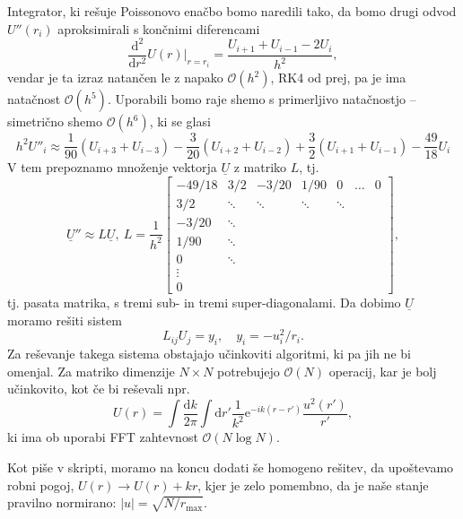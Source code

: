 \documentclass[12pt, a4 paper]{article}
\renewcommand{\d}{
	\ensuremath{\mathrm{d}}
}
\newcommand{\e}{
	\ensuremath{\mathrm{e}}
}
\begin{document}
Integrator, ki re\v suje Poissonovo ena\v cbo bomo naredili tako, da bomo drugi odvod $U''(r_i)$
aproksimirali s kon\v cnimi diferencami
\[
	\frac{\d^2}{\d r^2} U(r)\Big|_{r = r_i} = \frac{U_{i+1} + U_{i-1} - 2U_i}{h^2},
\]
vendar je ta izraz natan\v cen le z napako $\mathcal{O}(h^2)$, RK4 od prej, pa je ima nata\v cnost
$\mathcal{O}(h^5)$. Uporabili bomo raje shemo s primerljivo nata\v cnostjo -- simetri\v cno shemo $\mathcal{O}
(h^6)$, ki se glasi
\begin{equation}
	h^2 U''_i \approx \frac{1}{90}(U_{i+3} + U_{i-3}) - \frac{3}{20} (U_{i+2} + U_{i-2}) + \frac{3}{2}(U_{i+1}
		+ U_{i-1}) - \frac{49}{18}U_i
\end{equation}
V tem prepoznamo mno\v zenje vektorja $\underline{U}$ z matriko $L$, tj.
\begin{equation}
	\underline{U}'' \approx L\underline{U},\ L = \frac{1}{h^2}\begin{bmatrix}
		-49/18 & 3/2 & -3/20 & 1/90 & 0 & \ldots & 0 \\
		3/2 & \ddots & \ddots & \ddots & \ddots & \\
		-3/20 & \ddots & & & & \\
		1/90 & \ddots & & & & \\
		0 & \ddots & & & & \\
		\vdots & & & & & \\
		0 & & & & &
		\end{bmatrix},
\end{equation}
tj. pasata matrika, s tremi sub- in tremi super-diagonalami. Da dobimo $\underline{U}$ moramo re\v siti
sistem
\begin{equation}
	L_{ij} U_j = y_i,\quad y_i = -u_i^2/r_i.
\end{equation}
Za re\v sevanje takega sistema obstajajo u\v cinkoviti algoritmi, ki pa jih ne bi omenjal. Za matriko dimenzije
$N\times N$ potrebujejo $\mathcal{O}(N)$ operacij, kar je bolj u\v cinkovito, kot \v ce bi re\v sevali npr.
\[
	U(r) = \int \frac{\d k}{2\pi} \int \d r' \frac{1}{k^2} \e^{-ik(r - r')} \frac{u^2(r')}{r'},
\]
ki ima ob uporabi FFT zahtevnost $\mathcal{O}(N\log N)$.

Kot pi\v se v skripti, moramo na koncu dodati \v se homogeno
re\v sitev, da upo\v stevamo robni pogoj, $U(r) \to U(r) + kr$, kjer je zelo pomembno, da je na\v se stanje pravilno
normirano: $|u| = \sqrt{N/r_\text{max}}$.
\end{document}
